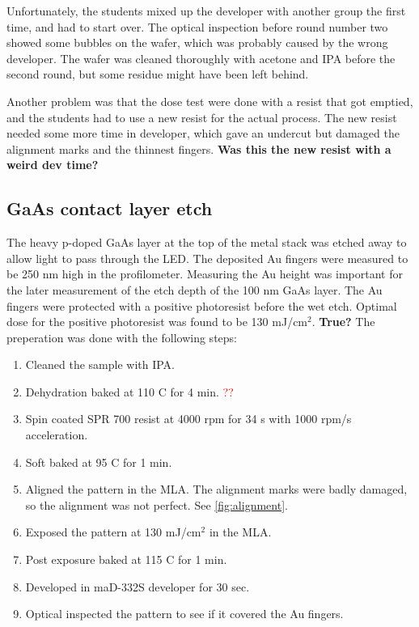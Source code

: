 Unfortunately, the students mixed up the developer with another group the first time, and had to start over.
The optical inspection before round number two showed some bubbles on the wafer, which was probably caused by the wrong developer.
The wafer was cleaned thoroughly with acetone and IPA before the second round, but some residue might have been left behind.

Another problem was that the dose test were done with a resist that got emptied, and the students had to use a new resist for the actual process.
The new resist needed some more time in developer, which gave an undercut but damaged the alignment marks and the thinnest fingers.
\textbf{Was this the new resist with a weird dev time?}




\subsection{GaAs contact layer etch}
\label{methods:wet_etch}
The heavy p-doped GaAs layer at the top of the metal stack was etched away to allow light to pass through the LED.
The deposited Au fingers were measured to be 250 nm high in the profilometer.
Measuring the Au height was important for the later measurement of the etch depth of the 100 nm GaAs layer.
The Au fingers were protected with a positive photoresist before the wet etch.
Optimal dose for the positive photoresist was found to be 130 mJ/cm$^2$. \textbf{True?}
The preperation was done with the following steps:
\begin{enumerate}
    \item Cleaned the sample with IPA.
    \item Dehydration baked at 110 \textdegree C for 4 min. \textcolor{red}{??}
    \item Spin coated SPR 700 resist at 4000 rpm for 34 s with 1000 rpm/s acceleration.
    \item Soft baked at 95 \textdegree C for 1 min.
    \item Aligned the pattern in the MLA. The alignment marks were badly damaged, so the alignment was not perfect. See \autoref{fig:alignment}.
    \item Exposed the pattern at 130 mJ/cm$^2$ in the MLA.
    \item Post exposure baked at 115 \textdegree C for 1 min.
    \item Developed in maD-332S developer for 30 sec.
    \item Optical inspected the pattern to see if it covered the Au fingers.
\end{enumerate}

